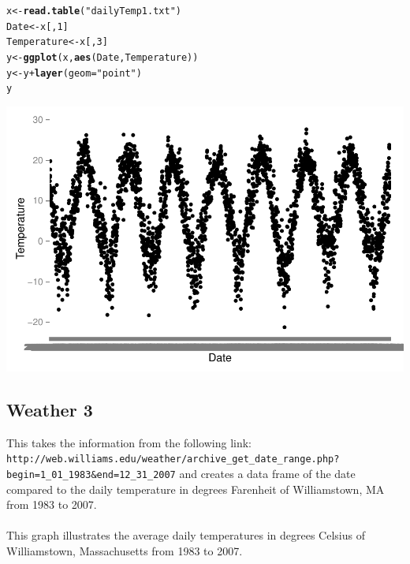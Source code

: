 \documentclass{article}\usepackage{graphicx, color}
\makeatletter
\def\maxwidth{ %
  \ifdim\Gin@nat@width>\linewidth
    \linewidth
  \else
    \Gin@nat@width
  \fi
}
\newcommand{\hlfunctioncall}[1]{\textcolor[rgb]{0.501960784313725,0,0.329411764705882}{\textbf{#1}}}%
\newcommand{\hlstring}[1]{\textcolor[rgb]{0.6,0.6,1}{#1}}%
\newenvironment{kframe}{%
 \def\at@end@of@kframe{}%
 \ifinner\ifhmode%
  \def\at@end@of@kframe{\end{minipage}}%
  \begin{minipage}{\columnwidth}%
 \fi\fi%
 \def\FrameCommand##1{\hskip\@totalleftmargin \hskip-\fboxsep
 \colorbox{shadecolor}{##1}\hskip-\fboxsep
     \hskip-\linewidth \hskip-\@totalleftmargin \hskip\columnwidth}%
 \MakeFramed {\advance\hsize-\width
   \@totalleftmargin\z@ \linewidth\hsize
   \@setminipage}}%
 {\par\unskip\endMakeFramed%
 \at@end@of@kframe}
\newenvironment{knitrout}{}{} %
\makeatother
\begin{document}
\begin{knitrout}
\color{fgcolor}\begin{kframe}
\begin{alltt}
x <- \hlfunctioncall{read.table}(\hlstring{"dailyTemp1.txt"})
Date <- x[, 1]
Temperature <- x[, 3]
y <- \hlfunctioncall{ggplot}(x, \hlfunctioncall{aes}(Date, Temperature))
y <- y + \hlfunctioncall{layer}(geom = \hlstring{"point"})
y
\end{alltt}
\end{kframe}
\includegraphics[width=\maxwidth]{figure/graph2} 

\end{knitrout}


\subsection*{Weather 3}
This takes the information from the following link:
 \verb+http://web.williams.edu/weather/archive_get_date_range.php?begin=1_01_1983&end=12_31_2007+
and creates a data frame of the date compared to the daily temperature
in degrees Farenheit of Williamstown, MA from 1983 to 2007.
\\
\\
This graph illustrates the average daily temperatures in degrees Celsius of
Williamstown, Massachusetts from 1983 to 2007.
\end{document}
